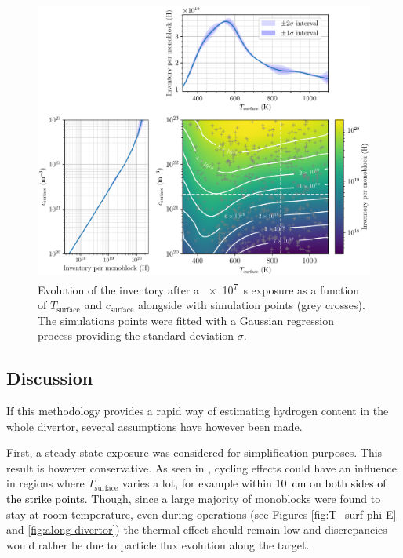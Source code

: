 \begin{figure} [h]
    \centering
    \includegraphics[width=\linewidth]{Figures/Chapter3/monoblocks/parametric_study/inventory_T_c_profiles.pdf}
    \caption{Evolution of the inventory after a \SI{e7}{s} exposure as a function of $T_\mathrm{surface}$ and $c_\mathrm{surface}$ alongside with simulation points (grey crosses). The simulations points were fitted with a Gaussian regression process \cite{chris_bowman_c-bowmaninference-tools_2020} providing the standard deviation $\sigma$.}
    \label{fig:inventory T c}
\end{figure}

\subsection{Discussion}
If this methodology provides a rapid way of estimating hydrogen content in the whole divertor, several assumptions have however been made.


First, a steady state exposure was considered for simplification purposes.
This result is however conservative.
As seen in \cite{delaporte-mathurin_finite_2019, hodille_estimation_2017}, cycling effects could have an influence in regions where $T_\mathrm{surface}$ varies a lot, for example \textcolor{black}{within \SI{10}{cm} on both sides of the strike points}.
Though, since a large majority of monoblocks were found to stay at room temperature, even during operations (see Figures \ref{fig:T_surf phi E} and \ref{fig:along divertor}) the thermal effect should remain low and discrepancies would rather be due to particle flux evolution along the target.

